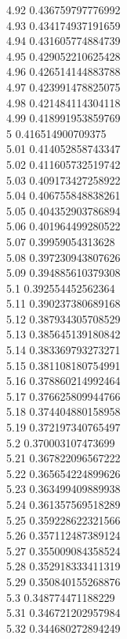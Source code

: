 {4.92	0.436759797776992\\
4.93	0.434174937191659\\
4.94	0.431605774884739\\
4.95	0.429052210625428\\
4.96	0.426514144883788\\
4.97	0.423991478825075\\
4.98	0.421484114304118\\
4.99	0.418991953859769\\
5	0.416514900709375\\
5.01	0.414052858743347\\
5.02	0.411605732519742\\
5.03	0.409173427258922\\
5.04	0.406755848838261\\
5.05	0.404352903786894\\
5.06	0.401964499280522\\
5.07	0.39959054313628\\
5.08	0.397230943807626\\
5.09	0.394885610379308\\
5.1	0.392554452562364\\
5.11	0.390237380689168\\
5.12	0.387934305708529\\
5.13	0.385645139180842\\
5.14	0.383369793273271\\
5.15	0.381108180754991\\
5.16	0.378860214992464\\
5.17	0.376625809944766\\
5.18	0.374404880158958\\
5.19	0.372197340765497\\
5.2	0.370003107473699\\
5.21	0.367822096567222\\
5.22	0.365654224899626\\
5.23	0.363499409889938\\
5.24	0.361357569518289\\
5.25	0.359228622321566\\
5.26	0.357112487389124\\
5.27	0.355009084358524\\
5.28	0.352918333411319\\
5.29	0.350840155268876\\
5.3	0.348774471188229\\
5.31	0.346721202957984\\
5.32	0.344680272894249\\
}
